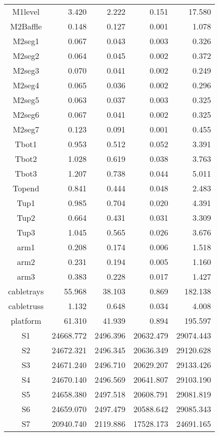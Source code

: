 \begin{longtable}{crrrr}
 M1level & 3.420 & 2.222 & 0.151 & 17.580 \\
 M2Baffle & 0.148 & 0.127 & 0.001 & 1.078 \\
 M2seg1 & 0.067 & 0.043 & 0.003 & 0.326 \\
 M2seg2 & 0.064 & 0.045 & 0.002 & 0.372 \\
 M2seg3 & 0.070 & 0.041 & 0.002 & 0.249 \\
 M2seg4 & 0.065 & 0.036 & 0.002 & 0.296 \\
 M2seg5 & 0.063 & 0.037 & 0.003 & 0.325 \\
 M2seg6 & 0.067 & 0.041 & 0.002 & 0.325 \\
 M2seg7 & 0.123 & 0.091 & 0.001 & 0.455 \\
 Tbot1 & 0.953 & 0.512 & 0.052 & 3.391 \\
 Tbot2 & 1.028 & 0.619 & 0.038 & 3.763 \\
 Tbot3 & 1.207 & 0.738 & 0.044 & 5.011 \\
 Topend & 0.841 & 0.444 & 0.048 & 2.483 \\
 Tup1 & 0.985 & 0.704 & 0.020 & 4.391 \\
 Tup2 & 0.664 & 0.431 & 0.031 & 3.309 \\
 Tup3 & 1.045 & 0.565 & 0.026 & 3.676 \\
 arm1 & 0.208 & 0.174 & 0.006 & 1.518 \\
 arm2 & 0.231 & 0.194 & 0.005 & 1.160 \\
 arm3 & 0.383 & 0.228 & 0.017 & 1.427 \\
 cabletrays & 55.968 & 38.103 & 0.869 & 182.138 \\
 cabletruss & 1.132 & 0.648 & 0.034 & 4.008 \\
 platform & 61.310 & 41.939 & 0.894 & 195.597 \\
 S1 & 24668.772 & 2496.396 & 20632.479 & 29074.443 \\
 S2 & 24672.321 & 2496.345 & 20636.349 & 29120.628 \\
 S3 & 24671.240 & 2496.710 & 20629.207 & 29133.426 \\
 S4 & 24670.140 & 2496.569 & 20641.807 & 29103.190 \\
 S5 & 24658.380 & 2497.518 & 20608.791 & 29081.819 \\
 S6 & 24659.070 & 2497.479 & 20588.642 & 29085.343 \\
 S7 & 20940.740 & 2119.886 & 17528.173 & 24691.165 \\
\bottomrule
\end{longtable}


